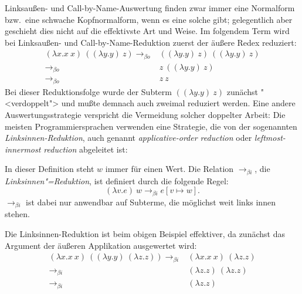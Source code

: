Linksaußen- und Call-by-Name-Auswertung finden zwar immer eine
Normalform bzw.\ eine schwache Kopfnormalform, wenn es eine solche
gibt; gelegentlich aber geschieht dies nicht auf die effektivste Art
und Weise.  Im folgendem Term wird bei Linksaußen- und
Call-by-Name-Reduktion zuerst der äußere Redex reduziert:
%
\begin{displaymath}
  \begin{array}{rl}
  (\lambda x.x~x)~((\lambda y.y)~z)
  \rightarrow_{\beta o} & 
  ((\lambda y.y)~z)~((\lambda y.y)~z)
  \\
  \rightarrow_{\beta o} & 
  z~((\lambda y.y)~z)
  \\
  \rightarrow_{\beta o} & 
  z~z
\end{array}
\end{displaymath}
%
Bei dieser Reduktionsfolge wurde der Subterm $((\lambda y.y)~z)$
zunächst "<verdoppelt"> und mußte demnach auch zweimal reduziert
werden.  Eine andere Auswertungsstrategie verspricht die Vermeidung
solcher doppelter Arbeit:  Die meisten Programmiersprachen verwenden
eine Strategie, die von der sogenannten \textit{Linksinnen-Reduktion},
auch genannt \emph{applicative-order reduction} oder
\emph{leftmost-innermost reduction} abgeleitet ist:
%
\begin{definition}
  In dieser Definition steht $w$ immer für einen Wert.
  Die Relation $\rightarrow_{\beta i}$, die
  \textit{Linksinnen"=Reduktion}, ist definiert durch die
  folgende Regel:
  \begin{displaymath}
    (\lambda v.e)~w \rightarrow_{\beta i} e[v \mapsto w].
  \end{displaymath}
  $\rightarrow_{\beta i}$ ist dabei nur anwendbar auf Subterme, die
  möglichst weit links innen stehen.
\end{definition}
%
Die Linksinnen-Reduktion ist beim obigen Beispiel effektiver, da
zunächst das Argument der äußeren Applikation ausgewertet wird:
%
\begin{displaymath}
  \begin{array}{rl}
  (\lambda x.x~x)~((\lambda y.y)~(\lambda z.z))
  \rightarrow_{\beta i} & 
  (\lambda x.x~x)~(\lambda z.z)
  \\
  \rightarrow_{\beta i} & 
  (\lambda z.z)~(\lambda z.z)
  \\
  \rightarrow_{\beta i} & 
  (\lambda z.z)
\end{array}
\end{displaymath}

